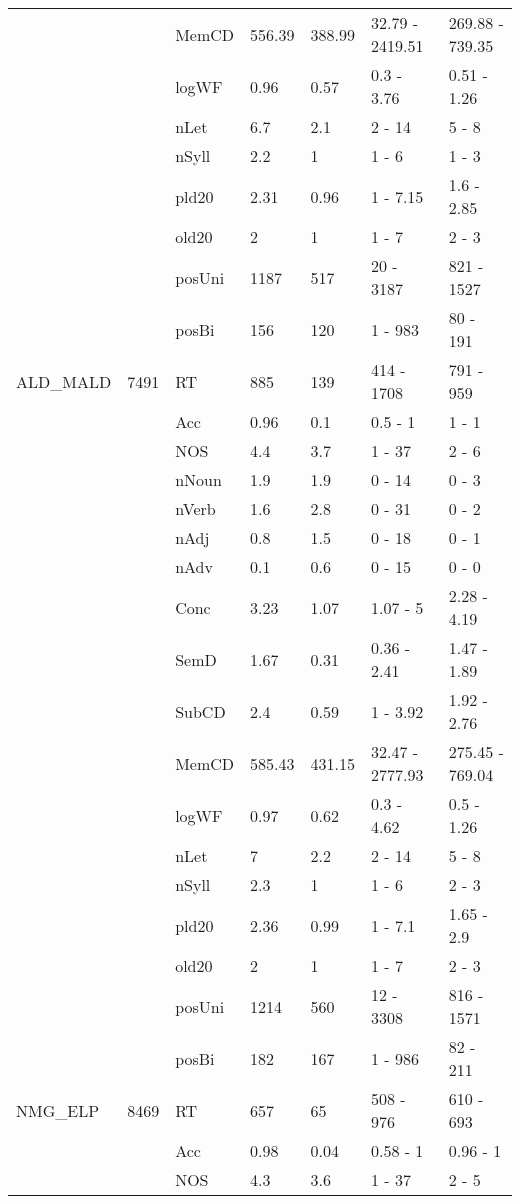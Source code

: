 \begin{table}[ht]
\begin{tabular}{lllllll}
   &  & MemCD & 556.39 & 388.99 & 32.79 - 2419.51 & 269.88 - 739.35 \\ 
   &  & logWF & 0.96 & 0.57 & 0.3 - 3.76 & 0.51 - 1.26 \\ 
   &  & nLet & 6.7 & 2.1 & 2 - 14 & 5 - 8 \\ 
   &  & nSyll & 2.2 & 1 & 1 - 6 & 1 - 3 \\ 
   &  & pld20 & 2.31 & 0.96 & 1 - 7.15 & 1.6 - 2.85 \\ 
   &  & old20 & 2 & 1 & 1 - 7 & 2 - 3 \\ 
   &  & posUni & 1187 & 517 & 20 - 3187 & 821 - 1527 \\ 
   &  & posBi & 156 & 120 & 1 - 983 & 80 - 191 \\ 
  ALD\_MALD & 7491 & RT & 885 & 139 & 414 - 1708 & 791 - 959 \\ 
   &  & Acc & 0.96 & 0.1 & 0.5 - 1 & 1 - 1 \\ 
   &  & NOS & 4.4 & 3.7 & 1 - 37 & 2 - 6 \\ 
   &  & nNoun & 1.9 & 1.9 & 0 - 14 & 0 - 3 \\ 
   &  & nVerb & 1.6 & 2.8 & 0 - 31 & 0 - 2 \\ 
   &  & nAdj & 0.8 & 1.5 & 0 - 18 & 0 - 1 \\ 
   &  & nAdv & 0.1 & 0.6 & 0 - 15 & 0 - 0 \\ 
   &  & Conc & 3.23 & 1.07 & 1.07 - 5 & 2.28 - 4.19 \\ 
   &  & SemD & 1.67 & 0.31 & 0.36 - 2.41 & 1.47 - 1.89 \\ 
   &  & SubCD & 2.4 & 0.59 & 1 - 3.92 & 1.92 - 2.76 \\ 
   &  & MemCD & 585.43 & 431.15 & 32.47 - 2777.93 & 275.45 - 769.04 \\ 
   &  & logWF & 0.97 & 0.62 & 0.3 - 4.62 & 0.5 - 1.26 \\ 
   &  & nLet & 7 & 2.2 & 2 - 14 & 5 - 8 \\ 
   &  & nSyll & 2.3 & 1 & 1 - 6 & 2 - 3 \\ 
   &  & pld20 & 2.36 & 0.99 & 1 - 7.1 & 1.65 - 2.9 \\ 
   &  & old20 & 2 & 1 & 1 - 7 & 2 - 3 \\ 
   &  & posUni & 1214 & 560 & 12 - 3308 & 816 - 1571 \\ 
   &  & posBi & 182 & 167 & 1 - 986 & 82 - 211 \\ 
  NMG\_ELP & 8469 & RT & 657 & 65 & 508 - 976 & 610 - 693 \\ 
   &  & Acc & 0.98 & 0.04 & 0.58 - 1 & 0.96 - 1 \\ 
   &  & NOS & 4.3 & 3.6 & 1 - 37 & 2 - 5 \\ 

\end{tabular}
\end{table}
